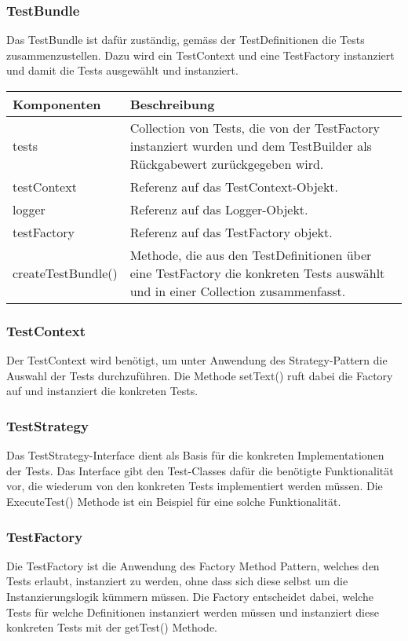 \documentclass[
	ngerman,
	toc=listof, %
	toc=bibliography, %
	footnotes=multiple, %
	parskip=half, %
	numbers=noendperiod %
]{scrartcl}
\begin{document}
	\subsubsection{TestBundle}
	Das TestBundle ist dafür zuständig, gemäss der TestDefinitionen die Tests zusammenzustellen. 
	Dazu wird ein TestContext und eine TestFactory instanziert und damit die Tests ausgewählt und instanziert.

	\begin{tabularx}{\textwidth}{lX}
		\toprule
			Komponenten & Beschreibung \\
		\midrule
			tests & Collection von Tests, die von der TestFactory instanziert wurden und dem TestBuilder als Rückgabewert zurückgegeben wird. \\
			testContext & Referenz auf das TestContext-Objekt. \\
			logger & Referenz auf das Logger-Objekt. \\
			testFactory & Referenz auf das TestFactory objekt. \\
		\midrule
			createTestBundle() & Methode, die aus den TestDefinitionen über eine TestFactory die konkreten Tests auswählt und in einer Collection zusammenfasst. \\
		\bottomrule
	\end{tabularx}

	\subsubsection{TestContext}
	Der TestContext wird benötigt, um unter Anwendung des Strategy-Pattern die Auswahl der Tests durchzuführen.
	Die Methode setText() ruft dabei die Factory auf und instanziert die konkreten Tests.

	\subsubsection{TestStrategy}
	Das TestStrategy-Interface dient als Basis für die konkreten Implementationen der Tests. 
	Das Interface gibt den Test-Classes dafür die benötigte Funktionalität vor, die wiederum von den konkreten Tests implementiert werden müssen.
	Die ExecuteTest() Methode ist ein Beispiel für eine solche Funktionalität.

	\subsubsection{TestFactory}
	Die TestFactory ist die Anwendung des Factory Method Pattern, welches den Tests erlaubt, instanziert zu werden, ohne dass sich diese selbst um die Instanzierungslogik kümmern müssen.
	Die Factory entscheidet dabei, welche Tests für welche Definitionen instanziert werden müssen und instanziert diese konkreten Tests mit der getTest() Methode.
\end{document}
